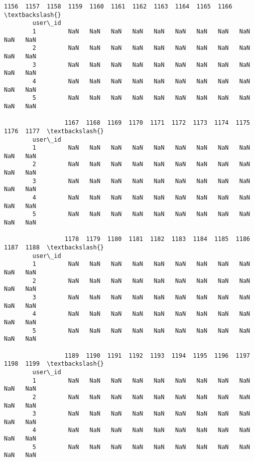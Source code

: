 \documentclass[11pt]{article}
\begin{document}
\begin{Verbatim}[commandchars=\\\{\}]
                 1156  1157  1158  1159  1160  1161  1162  1163  1164  1165  1166  \textbackslash{}
        user\_id                                                                     
        1         NaN   NaN   NaN   NaN   NaN   NaN   NaN   NaN   NaN   NaN   NaN   
        2         NaN   NaN   NaN   NaN   NaN   NaN   NaN   NaN   NaN   NaN   NaN   
        3         NaN   NaN   NaN   NaN   NaN   NaN   NaN   NaN   NaN   NaN   NaN   
        4         NaN   NaN   NaN   NaN   NaN   NaN   NaN   NaN   NaN   NaN   NaN   
        5         NaN   NaN   NaN   NaN   NaN   NaN   NaN   NaN   NaN   NaN   NaN   
        
                 1167  1168  1169  1170  1171  1172  1173  1174  1175  1176  1177  \textbackslash{}
        user\_id                                                                     
        1         NaN   NaN   NaN   NaN   NaN   NaN   NaN   NaN   NaN   NaN   NaN   
        2         NaN   NaN   NaN   NaN   NaN   NaN   NaN   NaN   NaN   NaN   NaN   
        3         NaN   NaN   NaN   NaN   NaN   NaN   NaN   NaN   NaN   NaN   NaN   
        4         NaN   NaN   NaN   NaN   NaN   NaN   NaN   NaN   NaN   NaN   NaN   
        5         NaN   NaN   NaN   NaN   NaN   NaN   NaN   NaN   NaN   NaN   NaN   
        
                 1178  1179  1180  1181  1182  1183  1184  1185  1186  1187  1188  \textbackslash{}
        user\_id                                                                     
        1         NaN   NaN   NaN   NaN   NaN   NaN   NaN   NaN   NaN   NaN   NaN   
        2         NaN   NaN   NaN   NaN   NaN   NaN   NaN   NaN   NaN   NaN   NaN   
        3         NaN   NaN   NaN   NaN   NaN   NaN   NaN   NaN   NaN   NaN   NaN   
        4         NaN   NaN   NaN   NaN   NaN   NaN   NaN   NaN   NaN   NaN   NaN   
        5         NaN   NaN   NaN   NaN   NaN   NaN   NaN   NaN   NaN   NaN   NaN   
        
                 1189  1190  1191  1192  1193  1194  1195  1196  1197  1198  1199  \textbackslash{}
        user\_id                                                                     
        1         NaN   NaN   NaN   NaN   NaN   NaN   NaN   NaN   NaN   NaN   NaN   
        2         NaN   NaN   NaN   NaN   NaN   NaN   NaN   NaN   NaN   NaN   NaN   
        3         NaN   NaN   NaN   NaN   NaN   NaN   NaN   NaN   NaN   NaN   NaN   
        4         NaN   NaN   NaN   NaN   NaN   NaN   NaN   NaN   NaN   NaN   NaN   
        5         NaN   NaN   NaN   NaN   NaN   NaN   NaN   NaN   NaN   NaN   NaN   
        

\end{Verbatim}
\end{document}
